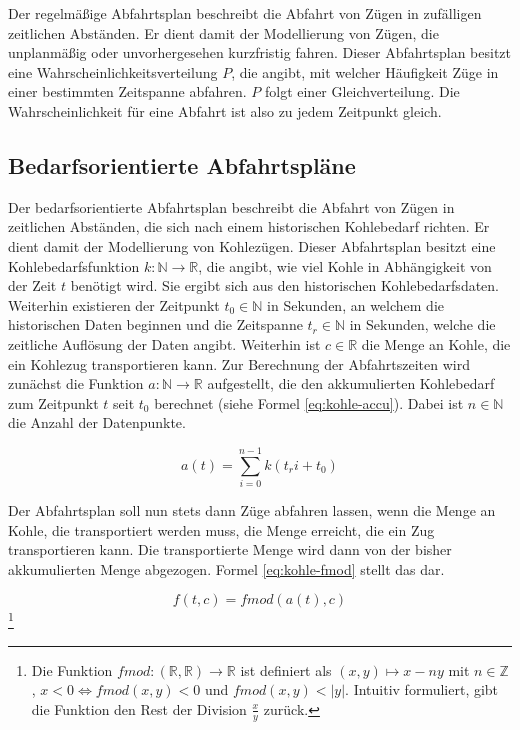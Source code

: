 Der regelmäßige Abfahrtsplan beschreibt die Abfahrt von Zügen in zufälligen zeitlichen Abständen. Er dient damit der Modellierung von Zügen, die unplanmäßig oder unvorhergesehen kurzfristig fahren. Dieser Abfahrtsplan besitzt eine Wahrscheinlichkeitsverteilung $P$, die angibt, mit welcher Häufigkeit Züge in einer bestimmten Zeitspanne abfahren. $P$ folgt einer Gleichverteilung. Die Wahrscheinlichkeit für eine Abfahrt ist also zu jedem Zeitpunkt gleich.

\subsection{Bedarfsorientierte Abfahrtspläne}

Der bedarfsorientierte Abfahrtsplan beschreibt die Abfahrt von Zügen in zeitlichen Abständen, die sich nach einem historischen Kohlebedarf richten. Er dient damit der Modellierung von Kohlezügen. Dieser Abfahrtsplan besitzt eine Kohlebedarfsfunktion $k:\mathbb{N}\to\mathbb{R}$, die angibt, wie viel Kohle in Abhängigkeit von der Zeit $t$ benötigt wird. Sie ergibt sich aus den historischen Kohlebedarfsdaten. Weiterhin existieren der Zeitpunkt $t_0 \in \mathbb{N}$ in Sekunden, an welchem die historischen Daten beginnen und die Zeitspanne $t_r \in \mathbb{N}$ in Sekunden, welche die zeitliche Auflösung der Daten angibt. Weiterhin ist $c\in\mathbb{R}$ die Menge an Kohle, die ein Kohlezug transportieren kann. Zur Berechnung der Abfahrtszeiten wird zunächst die Funktion $a: \mathbb{N} \to \mathbb{R}$ aufgestellt, die den akkumulierten Kohlebedarf zum Zeitpunkt $t$ seit $t_0$ berechnet (siehe Formel \ref{eq:kohle-accu}). Dabei ist $n\in\mathbb{N}$ die Anzahl der Datenpunkte.

\begin{equation}
    a(t)=\sum_{i=0}^{n-1}  k(t_ri+t_0)\label{eq:kohle-accu}
\end{equation}

Der Abfahrtsplan soll nun stets dann Züge abfahren lassen, wenn die Menge an Kohle, die transportiert werden muss, die Menge erreicht, die ein Zug transportieren kann. Die transportierte Menge wird dann von der bisher akkumulierten Menge abgezogen. Formel \ref{eq:kohle-fmod} stellt das dar.

\begin{equation}
    f(t, c)=fmod(a(t), c)\label{eq:kohle-fmod}
\end{equation}\footnote{Die Funktion $fmod:(\mathbb{R},\mathbb{R}) \to \mathbb{R}$ ist definiert als $(x,y)\mapsto x-ny$ mit $n\in\mathbb{Z}$, $x<0\Leftrightarrow fmod(x,y)<0$ und $fmod(x,y)<|y|$. Intuitiv formuliert, gibt die Funktion den Rest der Division $\frac{x}{y}$ zurück.}

